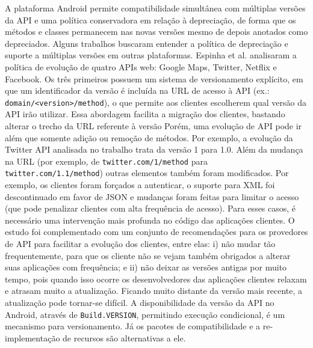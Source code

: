 A plataforma Android permite compatibilidade simultânea com múltiplas versões
da API e uma política conservadora em relação à depreciação, de forma que os
métodos e classes permanecem nas novas versões mesmo de depois anotados como
depreciados. Alguns trabalhos buscaram entender a política de depreciação e
suporte a múltiplas versões em outras plataformas. Espinha et al. \cite{Espinha2014}
analisaram a política de evolução de quatro APIs web: Google Maps, Twitter, 
Netflix e Facebook. Os três primeiros possuem um sistema de versionamento
explícito, em que um identificador da versão é incluída na URL de acesso à API
(ex.: \texttt{domain/<version>/method}), o que permite aos clientes escolherem qual
versão da API irão utilizar. Essa abordagem facilita a migração dos clientes, bastando
alterar o trecho da URL referente à versão  Porém, uma evolução de API pode ir além que
somente adição ou remoção de métodos. Por exemplo, a evolução da Twitter API analisada
no trabalho trata da versão 1 para 1.0. Além da mudança na URL (por exemplo, de
\texttt{twitter.com/1/method} para \texttt{twitter.com/1.1/method}) outras elementos
também foram modificados. Por exemplo, os clientes foram forçados a autenticar,
o suporte para XML foi descontinuado em favor de JSON e mudanças foram feitas para limitar
o acesso (que pode penalizar clientes com alta frequência de acesso). Para esses casos,
é necessário uma intervenção mais profunda no código das aplicações clientes. O estudo
foi complementado com um conjunto de recomendações para os provedores de API para
facilitar a evolução dos clientes, entre elas: i) não mudar tão frequentemente, para
que os cliente não se vejam também obrigados a alterar suas aplicações com frequência;
e ii) não deixar as versões antigas por muito tempo, pois quando  isso ocorre os
desenvolvedores das aplicações clientes relaxam e atrasam muito a atualização.
Ficando muito distante da versão mais recente, a atualização pode tornar-se difícil.
A disponibilidade da versão da API no Android, através de \texttt{Build.VERSION},
permitindo execução condicional, é um mecanismo para versionamento. Já os pacotes
de compatibilidade e a re-implementação de recursos são alternativas a ele.

